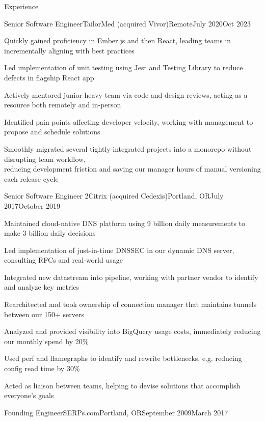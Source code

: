 \documentclass[letterpaper,10pt]{article}
\begin{document}
\begin{rsection}{Experience}
\begin{rexperienceitem}{Senior Software Engineer}{TailorMed (acquired Vivor)}{Remote}{July 2020}{Oct 2023}
  \item Quickly gained proficiency in Ember.js and then React, leading teams in incrementally aligning with best practices
  \item Led implementation of unit testing using Jest and Testing Library to reduce defects in flagship React app
  \item Actively mentored junior-heavy team via code and design reviews, acting as a resource both remotely and in-person
  \item Identified pain points affecting developer velocity, working with management to propose and schedule solutions
  \item Smoothly migrated several tightly-integrated projects into a monorepo without disrupting team workflow,\\
    reducing development friction and saving our manager hours of manual versioning each release cycle
\end{rexperienceitem}
\begin{rexperienceitem}{Senior Software Engineer 2}{Citrix (acquired Cedexis)}{Portland, OR}{July 2017}{October 2019}
  \item Maintained cloud-native DNS platform using 9 billion daily measurements to make 3 billion daily decisions
  \item Led implementation of just-in-time DNSSEC in our dynamic DNS server, consulting RFCs and real-world usage
  \item Integrated new datastream into pipeline, working with partner vendor to identify and analyze key metrics
  \item Rearchitected and took ownership of connection manager that maintains tunnels between our 150+ servers
  \item Analyzed and provided visibility into BigQuery usage costs, immediately reducing our monthly spend by 20\%
  \item Used perf and flamegraphs to identify and rewrite bottlenecks, e.g. reducing config read time by 30\%
  \item Acted as liaison between teams, helping to devise solutions that accomplish everyone's goals
\end{rexperienceitem}
\begin{rexperienceitem}{Founding Engineer}{SERPs.com}{Portland, OR}{September 2009}{March 2017}

\end{rexperienceitem}
\end{rsection}
\end{document}
